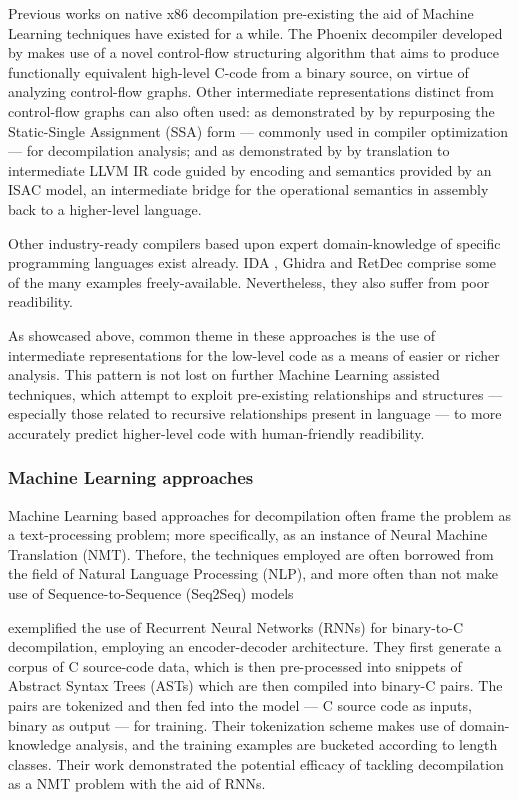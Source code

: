 \documentclass[../main.tex]{subfiles}
\begin{document}
Previous works on native x86 decompilation pre-existing the aid of Machine Learning
techniques have existed for a while. 
The Phoenix decompiler developed by \cite{brumley_native_2013} makes use of a novel
control-flow structuring algorithm that aims to produce functionally equivalent
high-level C-code from a binary source, on virtue of analyzing control-flow graphs.
Other intermediate representations distinct from control-flow graphs can also
often used: as demonstrated by \cite{van_emmerik_static_2007} by repurposing the 
Static-Single Assignment (SSA) form — commonly used in compiler optimization —
for decompilation analysis; and as demonstrated by \cite{durfina_design_2011} by 
translation to intermediate LLVM IR code guided by encoding and semantics provided
by an ISAC model, an intermediate bridge for the operational semantics in assembly
back to a higher-level language. 

Other industry-ready compilers based upon expert domain-knowledge of specific 
programming languages exist already. IDA \cite{hexrays}, Ghidra \cite{ghidra}
and RetDec \cite{retdec} comprise some of the many examples freely-available. 
Nevertheless, they also suffer from poor readibility.

As showcased above, common theme in these approaches is the use of intermediate 
representations for the low-level code as a means of easier or richer analysis.
This pattern is not lost on further Machine Learning assisted techniques, which
attempt to exploit pre-existing relationships and structures — especially those
related to recursive relationships present in language — to more accurately
predict higher-level code with human-friendly readibility.

\subsubsection{Machine Learning approaches}

Machine Learning based approaches for decompilation often frame the problem as a 
text-processing problem; more specifically, as an instance of Neural Machine 
Translation (NMT). Thefore, the techniques employed are often borrowed from the
field of Natural Language Processing (NLP), and more often than not make use of
Sequence-to-Sequence (Seq2Seq) models \cite{DBLP:journals/corr/SutskeverVL14}

\cite{katz_using_2018} exemplified the use of Recurrent Neural Networks (RNNs) for 
binary-to-C decompilation, employing an encoder-decoder architecture. They first 
generate a corpus of C source-code data, which is then pre-processed into snippets
of Abstract Syntax Trees (ASTs) which are then compiled into binary-C pairs. The
pairs are tokenized and then fed into the model — C source code as inputs, binary 
as output — for training. Their tokenization scheme makes use of domain-knowledge 
analysis, and the training examples are bucketed according to length classes.
Their work demonstrated the potential efficacy of tackling decompilation as a NMT 
problem with the aid of RNNs. 
\end{document}
